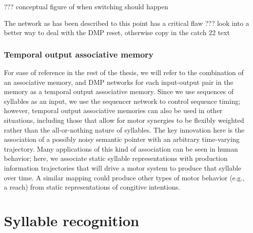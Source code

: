 ??? conceptual figure of when switching
should happen

The network as has been described to this point
has a critical flaw ??? look into a better
way to deal with the DMP reset,
otherwise copy in the catch 22 text

\subsubsection{Temporal output associative memory}

For ease of reference in the rest
of the thesis, we will refer to
the combination of an associative memory,
and DMP networks
for each input-output pair in the memory
as a temporal output associative memory.
Since we use sequences of syllables
as an input, we use the sequencer network
to control sequence timing;
however, temporal output associative memories
can also be used in other situations,
including those that allow for
motor synergies to be
flexibly weighted rather than
the all-or-nothing nature
of syllables.
The key innovation here is
the association of
a possibly noisy semantic pointer
with an arbitrary time-varying trajectory.
Many applications of this kind of association
can be seen in human behavior;
here, we associate static syllable representations
with production information trajectories
that will drive a motor system
to produce that syllable over time.
A similar mapping could produce
other types of motor behavior
(e.g., a reach)
from static representations
of congitive intentions.




\section{Syllable recognition}


